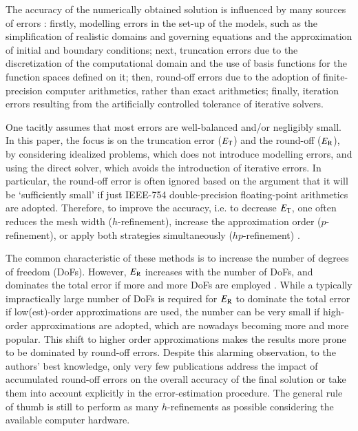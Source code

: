 \documentclass[review,3p]{elsarticle}
\begin{document}
The accuracy of the numerically obtained solution is influenced by many sources of errors \cite{ferziger2012computational}: firstly, modelling errors in the set-up of the models, such as the simplification of realistic domains and governing equations and the approximation of initial and boundary conditions; next, truncation errors due to the discretization of the computational domain and the use of basis functions for the function spaces defined on it; then, round-off errors due to the adoption of finite-precision computer arithmetics, rather than exact arithmetics; finally, iteration errors resulting from the artificially controlled tolerance of iterative solvers. 

One tacitly assumes that most errors are well-balanced and/or negligibly small. In this paper, the focus is on the truncation error ($E_{\rm T}$) and the round-off ($E_{\rm R}$), by considering idealized problems, which does not introduce modelling errors, and using the direct solver, which avoids the introduction of iterative errors. In particular, the round-off error is often ignored based on the argument that it will be `sufficiently small' if just IEEE-754 double-precision floating-point arithmetics \cite{zuras2008ieee} are adopted. Therefore, to improve the accuracy, i.e. to decrease $E_{\rm T}$, one often reduces the mesh width ($h$-refinement), increase the approximation order ($p$-refinement), or apply both strategies simultaneously ($hp$-refinement) \cite{guo1986hp,gockenbach2006understanding}. 

The common characteristic of these methods is to increase the number of degrees of freedom (DoFs).
However, $E_{\rm R}$ increases with the number of DoFs, and dominates the total error if more and more DoFs are employed \cite{alvarez2012round,Babuska2018Roundoff}. While a typically impractically large number of DoFs is required for $E_{\rm R}$ to dominate the total error if low(est)-order approximations are used, the number can be very small if high-order approximations are adopted, which are nowadays becoming more and more popular. This shift to higher order approximations makes the results more prone to be dominated by round-off errors. Despite this alarming observation, to the authors’ best knowledge, only very few publications address the impact of accumulated round-off errors on the overall accuracy of the final solution or take them into account explicitly in the error-estimation procedure. The general rule of thumb is still to perform as many $h$-refinements as possible considering the available computer hardware.
\end{document}
